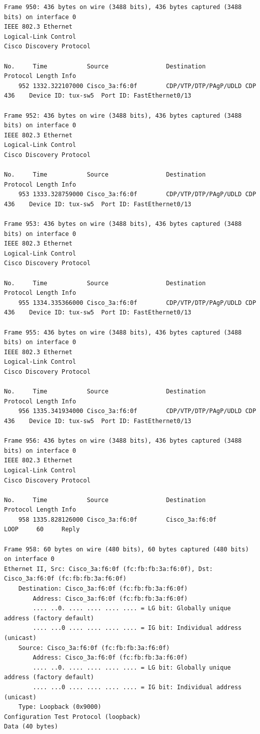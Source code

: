 \documentclass[a4paper,11pt]{article}
\begin{document}
\begin{lstlisting}
Frame 950: 436 bytes on wire (3488 bits), 436 bytes captured (3488 bits) on interface 0
IEEE 802.3 Ethernet 
Logical-Link Control
Cisco Discovery Protocol

No.     Time           Source                Destination           Protocol Length Info
    952 1332.322107000 Cisco_3a:f6:0f        CDP/VTP/DTP/PAgP/UDLD CDP      436    Device ID: tux-sw5  Port ID: FastEthernet0/13  

Frame 952: 436 bytes on wire (3488 bits), 436 bytes captured (3488 bits) on interface 0
IEEE 802.3 Ethernet 
Logical-Link Control
Cisco Discovery Protocol

No.     Time           Source                Destination           Protocol Length Info
    953 1333.328759000 Cisco_3a:f6:0f        CDP/VTP/DTP/PAgP/UDLD CDP      436    Device ID: tux-sw5  Port ID: FastEthernet0/13  

Frame 953: 436 bytes on wire (3488 bits), 436 bytes captured (3488 bits) on interface 0
IEEE 802.3 Ethernet 
Logical-Link Control
Cisco Discovery Protocol

No.     Time           Source                Destination           Protocol Length Info
    955 1334.335366000 Cisco_3a:f6:0f        CDP/VTP/DTP/PAgP/UDLD CDP      436    Device ID: tux-sw5  Port ID: FastEthernet0/13  

Frame 955: 436 bytes on wire (3488 bits), 436 bytes captured (3488 bits) on interface 0
IEEE 802.3 Ethernet 
Logical-Link Control
Cisco Discovery Protocol

No.     Time           Source                Destination           Protocol Length Info
    956 1335.341934000 Cisco_3a:f6:0f        CDP/VTP/DTP/PAgP/UDLD CDP      436    Device ID: tux-sw5  Port ID: FastEthernet0/13  

Frame 956: 436 bytes on wire (3488 bits), 436 bytes captured (3488 bits) on interface 0
IEEE 802.3 Ethernet 
Logical-Link Control
Cisco Discovery Protocol

No.     Time           Source                Destination           Protocol Length Info
    958 1335.828126000 Cisco_3a:f6:0f        Cisco_3a:f6:0f        LOOP     60     Reply

Frame 958: 60 bytes on wire (480 bits), 60 bytes captured (480 bits) on interface 0
Ethernet II, Src: Cisco_3a:f6:0f (fc:fb:fb:3a:f6:0f), Dst: Cisco_3a:f6:0f (fc:fb:fb:3a:f6:0f)
    Destination: Cisco_3a:f6:0f (fc:fb:fb:3a:f6:0f)
        Address: Cisco_3a:f6:0f (fc:fb:fb:3a:f6:0f)
        .... ..0. .... .... .... .... = LG bit: Globally unique address (factory default)
        .... ...0 .... .... .... .... = IG bit: Individual address (unicast)
    Source: Cisco_3a:f6:0f (fc:fb:fb:3a:f6:0f)
        Address: Cisco_3a:f6:0f (fc:fb:fb:3a:f6:0f)
        .... ..0. .... .... .... .... = LG bit: Globally unique address (factory default)
        .... ...0 .... .... .... .... = IG bit: Individual address (unicast)
    Type: Loopback (0x9000)
Configuration Test Protocol (loopback)
Data (40 bytes)


\end{lstlisting}
\end{document}
